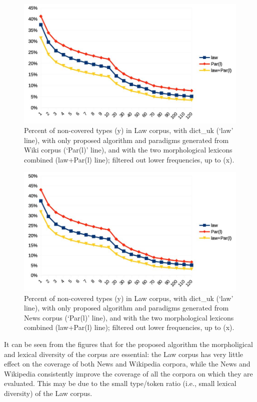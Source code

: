 \documentclass[11pt,a4paper]{article}
\begin{document}
\begin{figure}
	\includegraphics[width=\linewidth]{evaluation-coverage-lawW.jpg}
	\caption{Percent of non-covered types (y) in Law corpus, with dict\_uk (`law' line), with only proposed algorithm and paradigms generated from Wiki corpus (`Par(l)' line), and with the two morphological lexicons combined (law+Par(l) line); filtered out lower frequencies, up to (x).}
	\label{fig:pcNoTypLawW}
\end{figure}

\begin{figure}
	\includegraphics[width=\linewidth]{evaluation-coverage-lawN.jpg}
	\caption{Percent of non-covered types (y) in Law corpus, with dict\_uk (`law' line), with only proposed algorithm and paradigms generated from News corpus (`Par(l)' line), and with the two morphological lexicons combined (law+Par(l) line); filtered out lower frequencies, up to (x).}
	\label{fig:pcNoTypLawN}
\end{figure}


It can be seen from the figures that for the proposed algorithm the morpholigical and lexical diversity of the corpus are essential: the Law corpus has very little effect on the coverage of both News and Wikipedia corpora, while the News and Wikipedia consistently improve the coverage of all the corpora on which they are evaluated. This may be due to the small type/token ratio (i.e., small lexical diversity) of the Law corpus.
\end{document}
